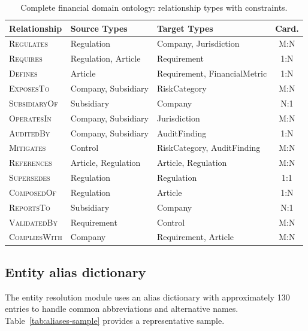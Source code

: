 \documentclass[review]{elsarticle}
\begin{document}
\begin{table}[ht]
\caption{Complete financial domain ontology: relationship types with constraints.}
\label{tab:rel-types-full}
\centering
\small
\begin{tabular}{@{}lllc@{}}
\toprule
\textbf{Relationship} & \textbf{Source Types} & \textbf{Target Types} & \textbf{Card.} \\
\midrule
\textsc{Regulates} & Regulation & Company, Jurisdiction & M:N \\
\textsc{Requires} & Regulation, Article & Requirement & 1:N \\
\textsc{Defines} & Article & Requirement, FinancialMetric & 1:N \\
\textsc{ExposesTo} & Company, Subsidiary & RiskCategory & M:N \\
\textsc{SubsidiaryOf} & Subsidiary & Company & N:1 \\
\textsc{OperatesIn} & Company, Subsidiary & Jurisdiction & M:N \\
\textsc{AuditedBy} & Company, Subsidiary & AuditFinding & 1:N \\
\textsc{Mitigates} & Control & RiskCategory, AuditFinding & M:N \\
\textsc{References} & Article, Regulation & Article, Regulation & M:N \\
\textsc{Supersedes} & Regulation & Regulation & 1:1 \\
\textsc{ComposedOf} & Regulation & Article & 1:N \\
\textsc{ReportsTo} & Subsidiary & Company & N:1 \\
\textsc{ValidatedBy} & Requirement & Control & M:N \\
\textsc{CompliesWith} & Company & Requirement, Article & M:N \\
\bottomrule
\end{tabular}
\end{table}

\subsection{Entity alias dictionary}

The entity resolution module uses an alias dictionary with approximately 130 entries to handle common abbreviations and alternative names. Table~\ref{tab:aliases-sample} provides a representative sample.
\end{document}
